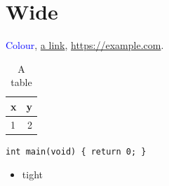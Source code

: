 \documentclass[12pt,twocolumn]{article}
\begin{document}
\section{Wide}
\textcolor{blue}{Colour}, \href{https://example.com}{a link}, \url{https://example.com}.
\begin{table}[h]\centering\caption{A table}
\begin{tabular}{lr}\toprule x & y\\ \midrule 1 & 2\\ \bottomrule\end{tabular}
\end{table}
\begin{lstlisting}
int main(void) { return 0; }
\end{lstlisting}
\begin{itemize}[noitemsep]\item tight\end{itemize}
\end{document}
